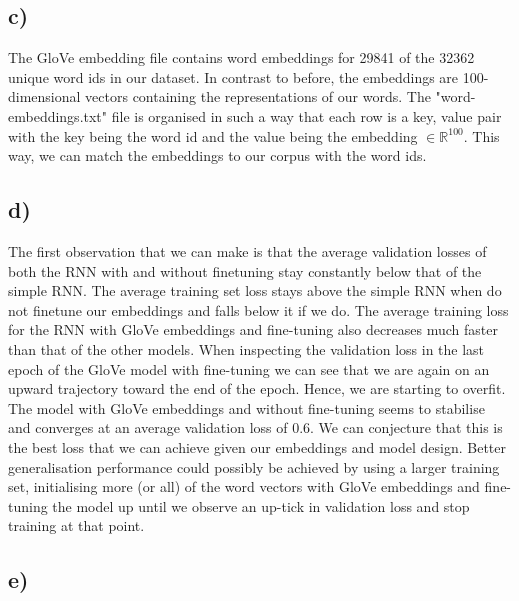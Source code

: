 \documentclass[11pt]{article}
\begin{document}
\subsection{c)}\label{subsec:rnn-c}
The GloVe \cite{pennington2014glove} embedding file contains word embeddings for 29841 of the 32362 unique word ids in our dataset. In contrast to before, the embeddings are 100-dimensional vectors containing the representations of our words. The "word-embeddings.txt" file is organised in such a way that each row is a key, value pair with the key being the word id and the value being the embedding $\in\mathbb{R}^{100}$. This way, we can match the embeddings to our corpus with the word ids.

\subsection{d)}\label{subsec:rnn-d}
The first observation that we can make is that the average validation losses of both the RNN with and without finetuning stay constantly below that of the simple RNN. The average training set loss stays above the simple RNN when do not finetune our embeddings and falls below it if we do. The average training loss for the RNN with GloVe embeddings and fine-tuning also decreases much faster than that of the other models. When inspecting the validation loss in the last epoch of the GloVe model with fine-tuning we can see that we are again on an upward trajectory toward the end of the epoch. Hence, we are starting to overfit. The model with GloVe embeddings and without fine-tuning seems to stabilise and converges at an average validation loss of 0.6. We can conjecture that this is the best loss that we can achieve given our embeddings and model design. Better generalisation performance could possibly be achieved by using a larger training set, initialising more (or all) of the word vectors with GloVe embeddings and fine-tuning the model up until we observe an up-tick in validation loss and stop training at that point.

\subsection{e)}\label{subsec:rnn-e}





\end{document}
